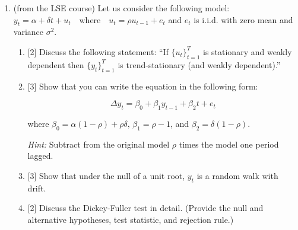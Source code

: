 \documentclass[12pt]{article}
\begin{document}
\begin{enumerate}
    \item (from the LSE course) Let us consider the following model:
     $y_t = \alpha + \delta t + u_t \quad \text{where} \quad u_t = \rho u_{t-1} + e_t$
    and \( e_t \) is i.i.d. with zero mean and variance \( \sigma^2 \).
    
    \begin{enumerate}
        \item {[2]} Discuss the following statement: ``If \(\{u_t\}_{t=1}^T\) is stationary and weakly dependent then \(\{y_t\}_{t=1}^T\) is trend-stationary (and weakly dependent).''
        
        \item {[3]} Show that you can write the equation in the following form:
        
        \[ \Delta y_t = \beta_0 + \beta_1 y_{t-1} + \beta_2 t + e_t \]
        
        where \( \beta_0 = \alpha(1 - \rho) + \rho \delta, \, \beta_1 = \rho - 1 \), and \( \beta_2 = \delta(1 - \rho) \).
        
        \textit{Hint:} Subtract from the original model \( \rho \) times the model one period lagged.
        
        \item {[3]} Show that under the null of a unit root, \( y_t \) is a random walk with drift.
        
        \item {[2]} Discuss the Dickey-Fuller test in detail. (Provide the null and alternative hypotheses, test statistic, and rejection rule.)
    \end{enumerate}
\end{enumerate}
\end{document}
